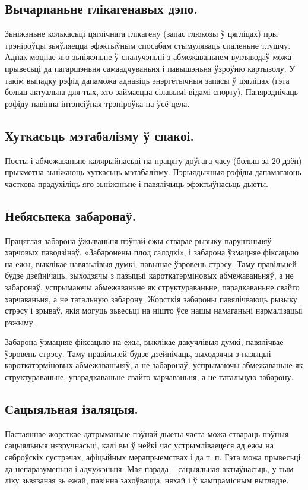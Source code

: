 \subsection{Вычарпаньне глікагенавых дэпо.}
Зьніжэньне колькасьці цяглічнага глікагену (запас глюкозы ў цягліцах) пры трэніроўцы зьяўляецца эфэктыўным спосабам стымуляваць спаленьне тлушчу. Аднак моцнае яго зьніжэньне ў спалучэньні з абмежаваньнем вугляводаў можа прывесьці да пагаршэньня самаадчуваньня і павышэньня ўзроўню картызолу. У такім выпадку рэфід дапаможа аднавіць энэргетычныя запасы ў цягліцах (гэта больш актуальна для тых, хто займаецца сілавымі відамі спорту). Папярэднічаць рэфіду павінна інтэнсіўная трэніроўка на ўсё цела.

\subsection{Хуткасьць мэтабалізму ў спакоі.}
Посты і абмежаваньне калярыйнасьці на працягу доўгага часу (больш за 20 дзён) прыкметна зьніжаюць хуткасьць мэтабалізму. Пэрыядычныя рэфіды дапамагаюць часткова прадухіліць яго зьніжэньне і павялічыць эфэктыўнасьць дыеты.

\subsection{Небясьпека забаронаў. }
Працяглая забарона ўжываньня пэўнай ежы стварае рызыку парушэньняў харчовых паводзінаў. «Забаронены плод салодкі», і забарона ўзмацняе фіксацыю на ежы, выклікае навязьлівыя думкі, павышае ўзровень стрэсу. Таму правільней будзе дзейнічаць, зыходзячы з пазыцыі кароткатэрміновых абмежаваньняў, а не забаронаў, успрымаючы абмежаваньне як структураваньне, парадкаваньне свайго харчаваньня, а не татальную забарону. Жорсткія забароны павялічваюць рызыку стрэсу і зрываў, якія могуць зьвесьці на нішто ўсе нашы намаганьні нармалізацыі рэжыму.

Забарона ўзмацняе фіксацыю на ежы, выклікае дакучлівыя думкі, павялічвае ўзровень стрэсу. Таму правільней будзе дзейнічаць, зыходзячы з пазыцыі кароткатэрміновых абмежаваньняў, а не забаронаў, успрымаючы абмежаваньне як структураваньне, упарадкаваньне свайго харчаваньня, а не татальную забарону.

\subsection{Сацыяльная ізаляцыя.}
Пастаяннае жорсткае датрыманьне пэўнай дыеты часта можа ствараць пэўныя сацыяльныя нязручнасьці, калі вы ў нейкі час устрымліваецеся ад ежы на сяброўскіх сустрэчах, афіцыйных мерапрыемствах і да т. п. Гэта можа прывесьці да непаразуменьня і адчужэньня. Мая парада – сацыяльная актыўнасьць, у тым ліку зьвязаная зь ежай, павінна захоўвацца, няхай і ў кампрамісным выглядзе.

